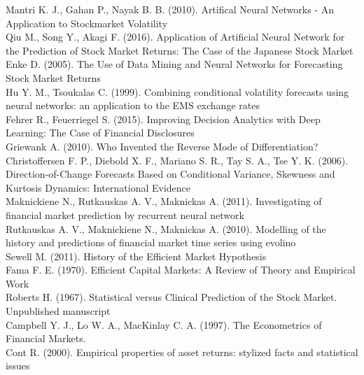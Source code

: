 \documentclass[12pt, letterpaper]{amsart}%
\begin{document}
Mantri K. J., Gahan P., Nayak B. B. (2010). Artifical Neural Networks - An Application to Stockmarket Volatility
\\

Qiu M., Song Y., Akagi F. (2016). Application of Artificial Neural Network for the Prediction of Stock Market Returns: The Case of the Japanese Stock Market
\\

Enke D. (2005). The Use of Data Mining and Neural Networks for Forecasting Stock Market Returns
\\

Hu Y. M., Tsoukalas C. (1999). Combining conditional volatility forecasts using neural networks: an application to the EMS exchange rates
\\

Fehrer R., Feuerriegel S. (2015). Improving Decision Analytics with Deep Learning: The
Case of Financial Disclosures
\\

Griewank A. (2010). Who Invented the Reverse Mode of Differentiation?
\\

Christoffersen F. P., Diebold X. F., Mariano S. R., Tay S. A., Tse Y. K. (2006). Direction-of-Change Forecasts Based on Conditional Variance, Skewness and Kurtosis Dynamics: International Evidence
\\

Maknickiene N., Rutkauskas A. V., Maknickas A. (2011). Investigating of financial market prediction by recurrent neural network
\\

Rutkauskas A. V., Maknickiene N., Maknickas A. (2010). Modelling of the history and predictions of financial market time series using evolino
\\

Sewell M. (2011). History of the Efficient Market Hypothesis
\\

Fama F. E. (1970). Efficient Capital Markets: A Review of Theory and Empirical Work
\\

Roberts H. (1967). Statistical versus Clinical Prediction of the Stock Market. Unpublished manuscript
\\

Campbell Y. J., Lo W. A., MacKinlay C. A. (1997). The Econometrics of Financial Markets.
\\

Cont R. (2000). Empirical properties of asset returns: stylized facts and statistical issues
\\
\end{document}
